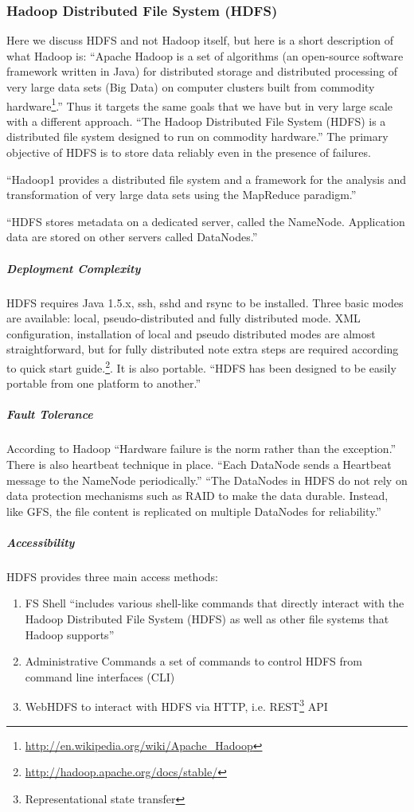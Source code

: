 \subsubsection{Hadoop Distributed File System (HDFS)}
Here we discuss HDFS and not Hadoop itself, but here is a short description of what Hadoop is:
``Apache Hadoop is a set of algorithms (an open-source software framework written in Java) 
for distributed storage and distributed processing of very large data sets (Big Data) 
on computer clusters built from commodity hardware\footnote{\url{http://en.wikipedia.org/wiki/Apache_Hadoop}}.''
Thus it targets the same goals that we have but in very large scale with a different approach.
``The Hadoop Distributed File System (HDFS) is a distributed file system designed to run on
commodity hardware.'' 
The primary objective of HDFS is to store data reliably even in the presence of failures.\cite[tp.~3]{HDFSDocuments}

``Hadoop1 provides a distributed file system and a framework 
for the analysis and transformation of very large data sets 
using the MapReduce \cite{DG04} paradigm.''\cite{TheHDFS}

``HDFS stores metadata on a
dedicated server, called the NameNode. Application data are stored on
other servers called DataNodes.''\cite{TheHDFS}


\subparagraph{Deployment Complexity}
HDFS requires Java 1.5.x, ssh, sshd and rsync to be installed. 
Three basic modes are available: local, pseudo-distributed and fully distributed mode. 
XML configuration, installation of local and pseudo distributed modes are almost straightforward,
but for fully distributed note extra steps are required according 
to quick start guide.\footnote{\url{http://hadoop.apache.org/docs/stable/}}.
It is also portable. ``HDFS has been designed to be easily portable from one platform to another.''\cite{TheHDFS}

\subparagraph{Fault Tolerance}
According to Hadoop ``Hardware failure is the norm rather than the exception.''
There is also heartbeat technique in place.
``Each DataNode sends a Heartbeat message to the NameNode periodically.''
``The DataNodes in HDFS do not rely on data protection mechanisms 
such as RAID to make the data durable. Instead, like GFS, 
the file content is replicated on multiple DataNodes for reliability.''\cite{TheHDFS}

\subparagraph{Accessibility}
HDFS provides three main access methods:
\begin{enumerate}
\item FS Shell ``includes various shell-like commands that directly interact with 
the Hadoop Distributed File System (HDFS) as well as other file systems that Hadoop supports''
\item Administrative Commands a set of commands to control HDFS from command line interfaces (CLI)
\item WebHDFS to interact with HDFS via HTTP, i.e. REST\footnote{Representational state transfer} API
\end{enumerate}

